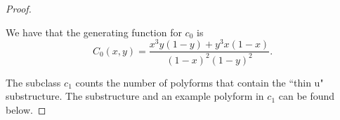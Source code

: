 \documentclass[12pt]{article}
\theoremstyle{plain}
\theoremstyle{definition}
\theoremstyle{remark}
\theoremstyle{definition}
\newcommand{\cellw}[4]{\draw[thick] ( #1 , #2 ) rectangle ( #3 , #4 );}
\newcommand{\cellb}[4]{\filldraw[black!60] ( #1 , #2 ) rectangle ( #3 , #4 ); \draw[thick] ( #1 , #2 ) rectangle ( #3 , #4 );}
\begin{document}
\begin{proof}
\begin{center}
\end{center}

We have that the generating function for $c_0$ is
$$C_0(x,y)=\frac{x^3 y (1-y) + y^3 x (1-x)}{(1-x)^2(1-y)^2}.$$

The subclass $c_1$ counts the number of polyforms that contain the ``thin u" substructure. The substructure and an example polyform in $c_1$ can be found below. 


\end{proof}
\end{document}
